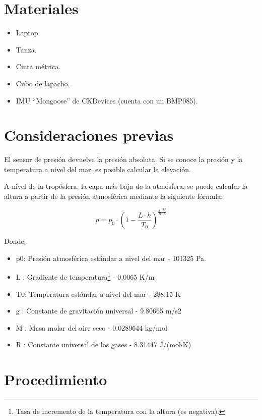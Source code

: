 \documentclass[main]{subfiles}
\begin{document}
\newpage
\section{Materiales}
\label{sec:materiales}

\begin{itemize}
\item Laptop.
\item Tanza.
\item Cinta métrica.
\item Cubo de lapacho.
\item IMU ``Mongoose'' de CKDevices (cuenta con un BMP085).
\end{itemize}

\section{Consideraciones previas}
\label{consideraciones}

El sensor de presión devuelve la presión absoluta. Si se conoce la presión y la temperatura a nivel del mar, es posible calcular la elevación.

A nivel de la tropósfera, la capa más baja de la atmósfera, se puede calcular la altura a partir de la presión atmosférica mediante la siguiente fórmula\cite{bib:alt-press}:

\begin{equation}
  \label{eq:press-alt}
  p = p_0 \cdot \left(1 - \frac{L \cdot h}{T_0} \right)^\frac{g \cdot M}{R \cdot L}
\end{equation}

Donde:
\begin{itemize}
\item p0: 	Presión atmosférica estándar a nivel del mar -	101325 Pa.
\item L :	Gradiente de temperatura\footnote{Tasa de incremento de la temperatura con la altura (es negativa).} -	0.0065 K/m
\item T0:	Temperatura estándar a nivel del mar -	288.15 K
\item g :	Constante de gravitación universal -	9.80665 m/s2
\item M :	Masa molar del aire seco -	0.0289644 kg/mol
\item R :	Constante universal de los gases - 	8.31447 J/(mol$\cdot$K)
\end{itemize}


\section{Procedimiento}
\label{sec:procedimiento}
\end{document}
